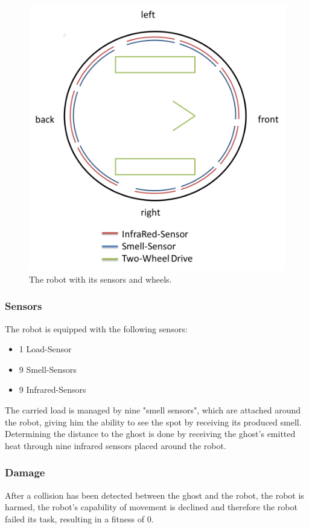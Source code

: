 \documentclass[12pt,fleqn,a4paper]{article}
\begin{document}
\begin{figure}[h]
\centering
\includegraphics[scale=0.333]{img/robot_neu.png}
\caption{The robot with its sensors and wheels.}
\label{fig:robot}
\end{figure}

\subsubsection{Sensors}
The robot is equipped with the following sensors:
\begin{itemize}
    \item 1 Load-Sensor
    \item 9 Smell-Sensors
    \item 9 Infrared-Sensors
\end{itemize}
The carried load is managed by nine "smell sensors", which are attached around the robot, giving him the ability to see the spot by receiving its produced smell. Determining the distance to the ghost is done by receiving the ghost's emitted heat through nine infrared sensors placed around the robot.

\subsubsection{Damage}
After a collision has been detected between the ghost and the robot, the robot is harmed, the robot's capability of movement is declined and therefore the robot failed its task, resulting in a fitness of 0.
\end{document}
